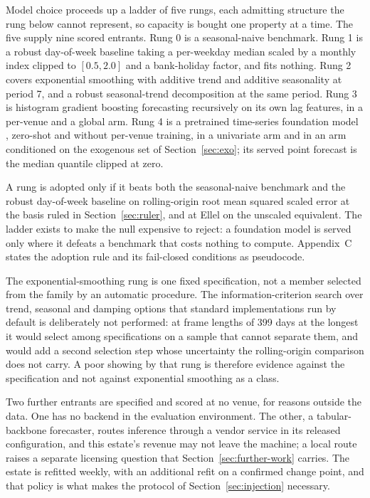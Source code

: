 Model choice proceeds up a ladder of five rungs, each admitting structure the rung below cannot
represent, so capacity is bought one property at a time. The five supply nine scored entrants.
Rung 0 is a seasonal-naive benchmark.
Rung 1 is a robust day-of-week baseline taking a per-weekday median scaled by a monthly index
clipped to $[0.5, 2.0]$ and a bank-holiday factor, and fits nothing. Rung 2 covers exponential
smoothing with additive trend and additive seasonality at period 7, and a robust seasonal-trend
decomposition at the same period. Rung 3 is histogram gradient boosting forecasting recursively
on its own lag features, in a per-venue and a global arm. Rung 4 is a pretrained time-series
foundation model \citep{ansari_chronos_2024}, zero-shot and without per-venue training, in a
univariate arm and in an arm conditioned on the exogenous set of Section~\ref{sec:exo}; its
served point forecast is the median quantile clipped at zero.

A rung is adopted only if it beats both the seasonal-naive benchmark and the robust day-of-week
baseline on rolling-origin root mean squared scaled error at the basis ruled in
Section~\ref{sec:ruler}, and at Ellel on the unscaled equivalent. The ladder exists to make the
null expensive to reject: a foundation model is served only where it defeats a benchmark that
costs nothing to compute. Appendix~C states the adoption rule and its fail-closed conditions as
pseudocode.

The exponential-smoothing rung is one fixed specification, not a member selected from the family
by an automatic procedure. The information-criterion search over trend, seasonal and damping
options that standard implementations run by default is deliberately not performed: at frame
lengths of 399 days at the longest it would select among specifications on a sample that cannot
separate them, and would add a second selection step whose uncertainty the rolling-origin
comparison does not carry. A poor showing by that rung is therefore evidence against the
specification and not against exponential smoothing as a class.

Two further entrants are specified and scored at no venue, for reasons outside the data. One has
no backend in the evaluation environment.
The other, a tabular-backbone forecaster, routes inference through a vendor service in its
released configuration, and this estate's revenue may not leave the machine; a local route raises
a separate licensing question that Section~\ref{sec:further-work} carries. The estate is refitted
weekly, with an additional refit on a confirmed change point, and that policy is what makes the
protocol of Section~\ref{sec:injection} necessary.

